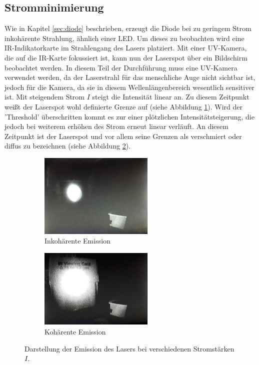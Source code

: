 \subsection{Stromminimierung}
Wie in Kapitel \ref{sec:diode} beschrieben, erzeugt die Diode bei zu geringem Strom inkohärente Strahlung, ähnlich einer LED. Um dieses zu beobachten wird eine IR-Indikatorkarte im Strahlengang des Lasers platziert. Mit einer UV-Kamera, die auf die IR-Karte fokussiert ist, kann nun der Laserspot über ein Bildschirm beobachtet werden. In diesem Teil der Durchführung muss eine UV-Kamera verwendet werden, da der Laserstrahl für das menschliche Auge nicht sichtbar ist, jedoch für die Kamera, da sie in diesem Wellenlängenbereich wesentlich sensitiver ist. Mit steigendem Strom $I$ steigt die Intensität linear an. Zu diesem Zeitpunkt weißt der Laserspot wohl definierte Grenze auf (siehe Abbildung \ref{fig:Theorie3}). Wird der 'Threshold' überschritten kommt es zur einer plötzlichen Intensitätsteigerung, die jedoch bei weiterem erhöhen des Strom erneut linear verläuft. An diesem Zeitpunkt ist der Laserspot und vor allem seine Grenzen als verschmiert oder diffus zu bezeichnen (siehe Abbildung \ref{fig:Theorie4}).

\begin{figure}
\centering
\begin{subfigure}{.5\textwidth}
	\centering
	\includegraphics[width=0.6\textwidth]{ressources/inkohaerent.jpg}
	\caption{Inkohärente Emission}
	\label{fig:Theorie3}
\end{subfigure}%
\begin{subfigure}{.5\textwidth}
	\centering
	\includegraphics[width=0.6\textwidth]{ressources/kohaerent.jpg}
	\caption{Kohärente Emission}
	\label{fig:Theorie4}
\end{subfigure}
\caption{Darstellung der Emission des Lasers bei verschiedenen Stromstärken $I$.}
\label{fig:theo7}
\end{figure}


